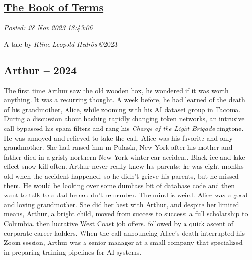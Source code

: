 %

\subsection*{\href{http://analyzethedatanotthedrivel.org/2023/11/28/the-book-of-terms/}{The Book of Terms}}


\noindent\emph{Posted: 28 Nov 2023 18:43:06}
\vspace{6pt}

A tale by \emph{Kline Leopold Hedrös} ©2023

\hypertarget{arthur-2024}{%
\subsection*{­Arthur -- 2024}\label{arthur-2024}}

The first time Arthur saw the old wooden box, he wondered if it was
worth anything. It was a recurring thought. A week before, he had
learned of the death of his grandmother, Alice, while zooming with his
AI dataset group in Tacoma. During a discussion about hashing rapidly
changing token networks, an intrusive call bypassed his spam filters and
rang his \emph{Charge of the Light Brigade} ringtone. He was annoyed and
relieved to take the call. Alice was his favorite and only grandmother.
She had raised him in Pulaski, New York after his mother and father died
in a grisly northern New York winter car accident. Black ice and
lake-effect snow kill often. Arthur never really knew his parents; he
was eight months old when the accident happened, so he didn't grieve his
parents, but he missed them. He would be looking over some dumbass bit
of database code and then want to talk to a dad he couldn't remember.
The mind is weird. Alice was a good and loving grandmother. She did her
best with Arthur, and despite her limited means, Arthur, a bright child,
moved from success to success: a full scholarship to Columbia, then
lucrative West Coast job offers, followed by a quick ascent of corporate
career ladders. When the call announcing Alice's death interrupted his
Zoom session, Arthur was a senior manager at a small company that
specialized in preparing training pipelines for AI systems.

